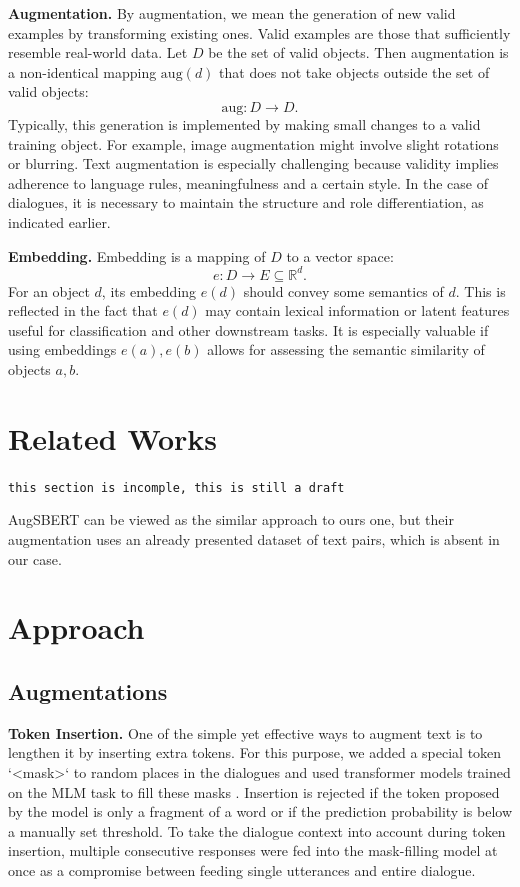 \documentclass{article}
\begin{document}
\textbf{Augmentation.} By augmentation, we mean the generation of new valid examples by transforming existing ones. Valid examples are those that sufficiently resemble real-world data. Let $D$ be the set of valid objects. Then augmentation is a non-identical mapping $\text{aug}(d)$ that does not take objects outside the set of valid objects:
$$
\text{aug}: D\to D.
$$
Typically, this generation is implemented by making small changes to a valid training object. For example, image augmentation might involve slight rotations or blurring. Text augmentation is especially challenging because validity implies adherence to language rules, meaningfulness and a certain style. In the case of dialogues, it is necessary to maintain the structure and role differentiation, as indicated earlier.

\textbf{Embedding.} Embedding is a mapping of $D$ to a vector space:
$$
e:D\to E\subseteq\mathbb{R}^d.
$$
For an object $d$, its embedding $e(d)$ should convey some semantics of $d$. This is reflected in the fact that $e(d)$ may contain lexical information or latent features useful for classification and other downstream tasks. It is especially valuable if using embeddings $e(a), e(b)$ allows for assessing the semantic similarity of objects $a, b$.

\section{Related Works}

\texttt{this section is incomple, this is still a draft }

AugSBERT \cite{thakur2021augmented} can be viewed as the similar approach to ours one, but their augmentation uses an already presented dataset of text pairs, which is absent in our case.

\section{Approach}

\subsection{Augmentations} \label{sec:aug}

\textbf{Token Insertion.} One of the simple yet effective ways to augment text is to lengthen it by inserting extra tokens. For this purpose, we added a special token `<mask>` to random places in the dialogues and used transformer models trained on the MLM task to fill these masks \cite{devlin2019bert}. Insertion is rejected if the token proposed by the model is only a fragment of a word \cite{wu2016googles, sennrich-etal-2016-neural} or if the prediction probability is below a manually set threshold. To take the dialogue context into account during token insertion, multiple consecutive responses were fed into the mask-filling model at once as a compromise between feeding single utterances and entire dialogue.
\end{document}
